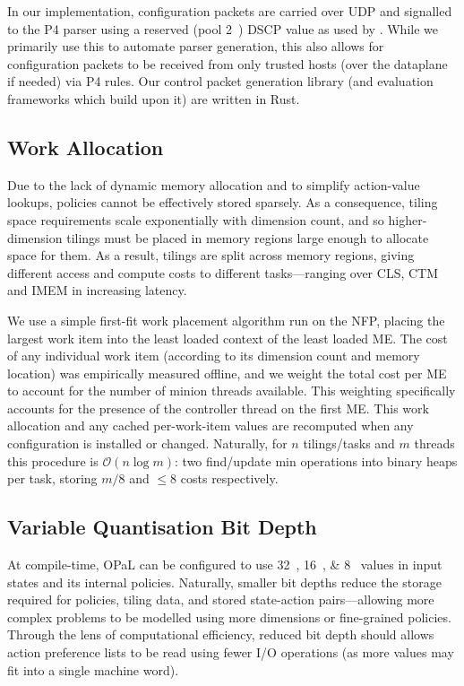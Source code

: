 \documentclass[sigconf,natbib=false]{acmart}
\newcommand{\approachshort}{OPaL}
\begin{document}
In our implementation, configuration packets are carried over UDP and signalled to the P4 parser using a reserved (pool 2~\parencite{rfc2474}) DSCP value as used by \textcite{DBLP:conf/isca/LiLYCSH19}.
While we primarily use this to automate parser generation, this also allows for configuration packets to be received from only trusted hosts (over the dataplane if needed) via P4 rules.
Our control packet generation library (and evaluation frameworks which build upon it) are written in Rust.

\subsection{Work Allocation}
Due to the lack of dynamic memory allocation and to simplify action-value lookups, policies cannot be effectively stored sparsely.
As a consequence, tiling space requirements scale exponentially with dimension count, and so higher-dimension tilings must be placed in memory regions large enough to allocate space for them.
As a result, tilings are split across memory regions, giving different access and compute costs to different tasks---ranging over CLS, CTM and IMEM in increasing latency.

We use a simple first-fit work placement algorithm run on the NFP, placing the largest work item into the least loaded context of the least loaded ME.
The cost of any individual work item (according to its dimension count and memory location) was empirically measured offline, and we weight the total cost per ME to account for the number of minion threads available.
This weighting specifically accounts for the presence of the controller thread on the first ME.
This work allocation and any cached per-work-item values are recomputed when any configuration is installed or changed.
Naturally, for $n$ tilings/tasks and $m$ threads this procedure is $\mathcal{O}{\left(n\log{m}\right)}$: two find/update min operations into binary heaps per task, storing $m/8$ and $\le8$ costs respectively.

\subsection{Variable Quantisation Bit Depth}
At compile-time, \approachshort{} can be configured to use \SIlist[list-final-separator = { or }]{32;16;8}{\bit} values in input states and its internal policies.
Naturally, smaller bit depths reduce the storage required for policies, tiling data, and stored state-action pairs---allowing more complex problems to be modelled using more dimensions or fine-grained policies.
Through the lens of computational efficiency, reduced bit depth should allows action preference lists to be read using fewer I/O operations (as more values may fit into a single machine word).
\end{document}
